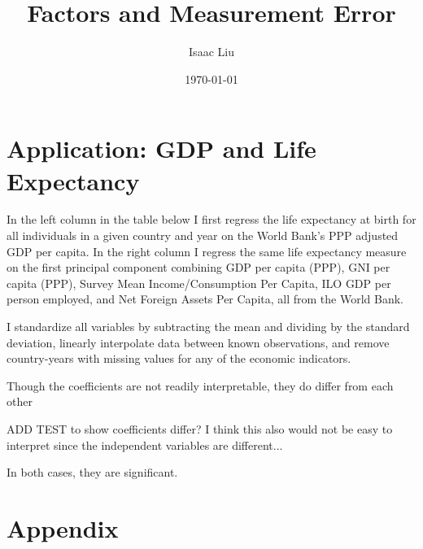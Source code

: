 \documentclass{report}
\title{Factors and Measurement Error}
\author{Isaac Liu}
\date{\today}
\begin{document}
	\maketitle

	\newpage \clearpage

    \section*{Application: GDP and Life Expectancy}

	In the left column in the table below I first regress the life expectancy at birth for all individuals in a given country and year on the World Bank's PPP adjusted GDP per capita. In the right column I regress the same life expectancy measure on the first principal component combining GDP per capita (PPP), GNI per capita (PPP), Survey Mean Income/Consumption Per Capita, ILO GDP per person employed, and Net Foreign Assets Per Capita, all from the World Bank.
	
	I standardize all variables by subtracting the mean and dividing by the standard deviation, linearly interpolate data between known observations, and remove country-years with missing values for any of the economic indicators.

    

	Though the coefficients are not readily interpretable, they do differ from each other

	ADD TEST to show coefficients differ? I think this also would not be easy to interpret since the independent variables are different...

	In both cases, they are significant.

    \clearpage \newpage

    \appendix

    \section*{Appendix}
\end{document}
